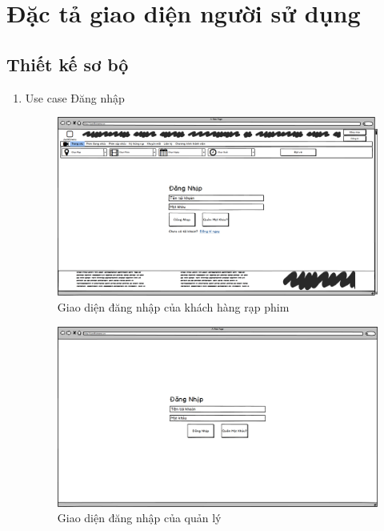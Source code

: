 \documentclass[a4paper, 12pt]{article}
\begin{document}
    \section{Đặc tả giao diện người sử dụng}
    \label{sec:describeUI}

    \subsection{Thiết kế sơ bộ}
    \begin{enumerate}
        \item Use case Đăng nhập
        \begin{figure}[H]
            \begin{center}
                \includegraphics[scale = 0.25]{Wireframe/User/Đăng nhập.png}
                \caption{Giao diện đăng nhập của khách hàng rạp phim}
            \end{center}
        \end{figure}
        \begin{figure}[H]
            \begin{center}
                \includegraphics[scale = 0.25]{Wireframe/Manager/Quản lý_Đăng nhập.png}
                \caption{Giao diện đăng nhập của quản lý}
            \end{center}
        \end{figure}


\end{enumerate}
\end{document}
